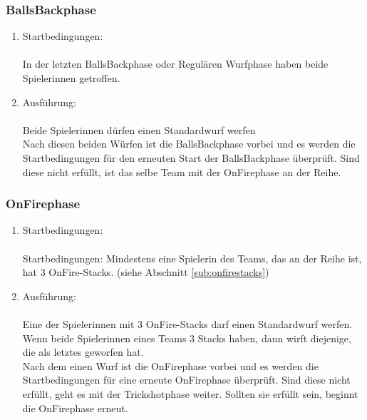 \documentclass[a5paper, 12pt]{book}
\begin{document}
\subsubsection{BallsBackphase}\label{subsub:ballsbackphase}
\begin{enumerate}[(1)]
    \item Startbedingungen:\\\\
    In der letzten BallsBackphase oder Regulären Wurfphase haben beide Spielerinnen getroffen.
    \item Ausführung:\\\\
    Beide Spielerinnen dürfen einen Standardwurf werfen\\
Nach diesen beiden Würfen ist die BallsBackphase vorbei und es werden die Startbedingungen für den erneuten Start der BallsBackphase überprüft. Sind diese nicht erfüllt, ist das selbe Team mit der OnFirephase an der Reihe.

\end{enumerate}
\subsubsection{OnFirephase}\label{subsub:onfirephase}
\begin{enumerate} [(1)]
    \item Startbedingungen:\\\\
    Startbedingungen: Mindestens eine Spielerin des Teams, das an der Reihe ist, hat 3 OnFire-Stacks. (siehe Abschnitt \ref{sub:onfirestacks})
    \item Ausführung:\\\\
    Eine der Spielerinnen mit 3 OnFire-Stacks darf 
 einen Standardwurf werfen. Wenn beide Spielerinnen eines Teams 3 Stacks haben, dann wirft diejenige, die als letztes geworfen hat. \\
Nach dem einen Wurf ist die OnFirephase vorbei und es werden die Startbedingungen für eine erneute OnFirephase überprüft. Sind diese nicht erfüllt, geht es mit der Trickshotphase weiter. Sollten sie erfüllt sein, beginnt die OnFirephase erneut.


\end{enumerate}
\end{document}
